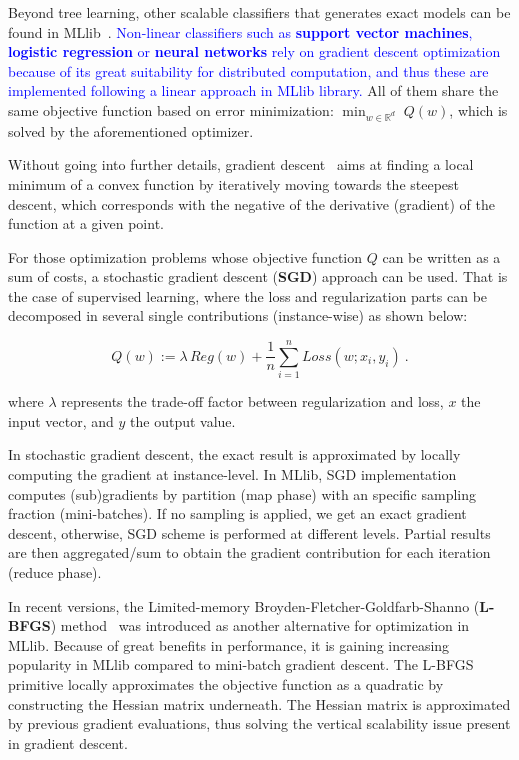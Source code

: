 \documentclass[3p,review]{elsarticle}
\begin{document}
	Beyond tree learning, other scalable classifiers that generates exact models can be found in MLlib~\cite{mllibguide}. \textcolor{blue}{Non-linear classifiers such as \textbf{support vector machines}, \textbf{logistic regression} or \textbf{neural networks} rely on gradient descent optimization because of its great suitability for distributed computation, and thus these are implemented following a linear approach in MLlib library.} All of them share the same objective function based on error minimization: $\min_{w \in \mathbb{R}^d} \; Q(w)$, which is solved by the aforementioned optimizer.
	
	Without going into further details, gradient descent~\cite{hastie11} aims at finding a local minimum of a convex function by iteratively moving towards the steepest descent, which corresponds with the negative of the derivative (gradient) of the function at a given point. 
	
	For those optimization problems whose objective function $Q$ can be written as a sum of costs, a stochastic gradient descent (\textbf{SGD}) approach can be used. That is the case of supervised learning, where the loss and regularization parts can be decomposed in several single contributions (instance-wise) as shown below:
	
	\begin{equation}
	Q(w) := 
	\lambda\, Reg(w) +
	\frac1n \sum_{i=1}^n Loss(w;x_i,y_i) 
	\label{eq:regPrimal}
	\ .
	\end{equation}
	
	\noindent where $\lambda$ represents the trade-off factor between regularization and loss, $x$ the input vector, and $y$ the output value.
	
	In stochastic gradient descent, the exact result is approximated by locally computing the gradient at instance-level. In MLlib, SGD implementation computes (sub)gradients by partition (map phase) with an specific sampling fraction (mini-batches). If no sampling is applied, we get an exact gradient descent, otherwise, SGD scheme is performed at different levels. Partial results are then aggregated/sum to obtain the gradient contribution for each iteration (reduce phase).  
	
	In recent versions, the Limited-memory Broyden-Fletcher-Goldfarb-Shanno (\textbf{L-BFGS}) method~\cite{liu89} was introduced as another alternative for optimization in MLlib. Because of great benefits in performance, it is gaining increasing popularity in MLlib compared to mini-batch gradient descent. The L-BFGS primitive locally approximates the objective function as a quadratic by constructing the Hessian matrix underneath. The Hessian matrix is approximated by previous gradient evaluations, thus solving the vertical scalability issue present in gradient descent.
	
\end{document}
